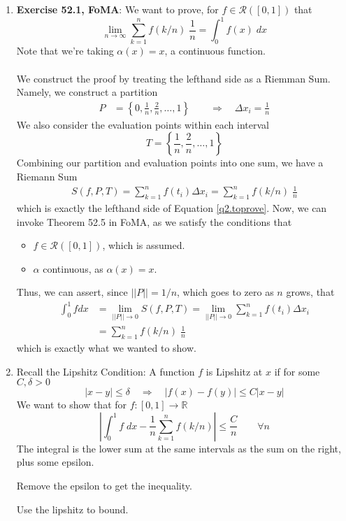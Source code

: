 \documentclass[12pt]{article}
\theoremstyle{plain}
\theoremstyle{definition}
\theoremstyle{remark}
\begin{document}
\begin{enumerate}
\item \textbf{Exercise 52.1, FoMA}: We want to prove, for $f \in \mathscr{R}([0,1])$ that
\begin{equation}
    \label{q2.toprove}
    \lim_{n\rightarrow\infty} \sum^n_{k=1} f(k/n)\;
        \frac{1}{n} = \int^1_0 f(x) \; dx
\end{equation}
Note that we're taking $\alpha(x) = x$, a continuous function.
\\
\\
We construct the proof by treating the lefthand side as a Riemman Sum. Namely, we construct a partition
\begin{align*}
    P &= \left\{0, \frac{1}{n}, \frac{2}{n}, \ldots, 1\right\} 
    \qquad 
    \Rightarrow \quad \Delta x_i = \frac{1}{n}
\end{align*}
We also consider the evaluation points within each interval
\begin{equation}
    T = \left\{\frac{1}{n}, \frac{2}{n}, \ldots, 1\right\} 
\end{equation}
Combining our partition and evaluation points into one sum, we have a Riemann Sum
\begin{align*}
    S(f,P,T) = \sum^n_{k=1} f(t_i) \Delta x_i = 
        \sum^n_{k=1} f(k/n)\;
        \frac{1}{n}
\end{align*}
which is exactly the lefthand side of Equation \ref{q2.toprove}. Now, we can invoke Theorem 52.5 in FoMA, as we satisfy the conditions that
\begin{itemize}
    \item $f \in \mathscr{R}([0,1])$, which is assumed. 
    \item $\alpha$ continuous, as $\alpha(x)=x$.
\end{itemize}
Thus, we can assert, since $||P|| = 1/n$, which goes to zero as $n$ grows, that
\begin{align*}
    \int^1_0 f dx &= \lim_{||P||\rightarrow 0} S(f,P,T) 
    = \lim_{||P||\rightarrow 0} \sum^n_{k=1} f(t_i) \Delta x_i\\
    &= \sum^n_{k=1} f(k/n)\; \frac{1}{n}
\end{align*}
which is exactly what we wanted to show.

\item Recall the Lipshitz Condition: A function $f$ is Lipshitz at $x$ if for some $C, \delta >0$
\begin{equation}
    |x-y| \leq \delta \quad \Rightarrow \quad
    |f(x) - f(y)| \leq C|x-y|
\end{equation}
We want to show that for $f: [0,1] \rightarrow \mathbb{R}$
\begin{equation}
    \left\lvert \int^1_0 f \; dx - \frac{1}{n} \sum^n_{k=1}
        f(k/n) \right\rvert \leq \frac{C}{n} \qquad \forall n
\end{equation}
The integral is the lower sum at the same intervals as the sum on the right, plus some epsilon.

Remove the epsilon to get the inequality.

Use the lipshitz to bound.











\end{enumerate}
\end{document}
